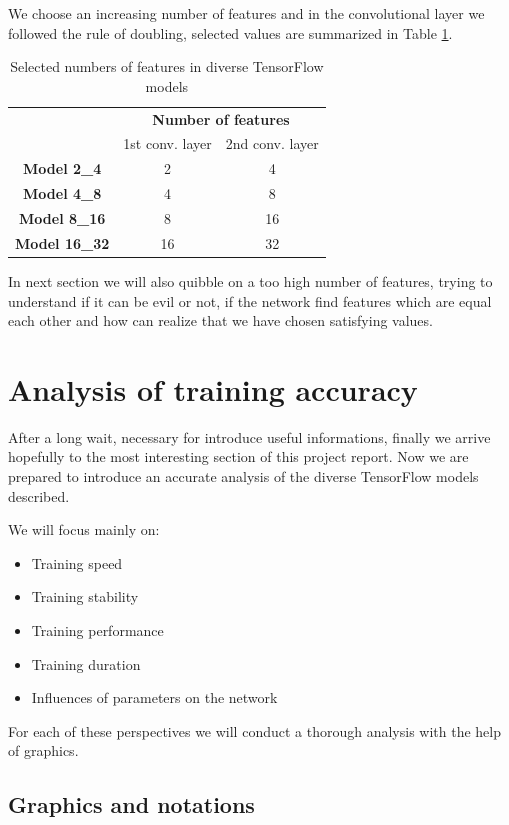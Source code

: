 We choose an increasing number of features and in the convolutional layer we followed the rule of doubling, selected values are summarized in Table \ref{tab:features_number}.

\begin{table}
	\caption{Selected numbers of features in diverse TensorFlow models}
	\label{tab:features_number}
	\centering
	\begin{tabular}{ccc}
		\hline 
		& \multicolumn{2}{c}{\textbf{Number of features}} \\ 
		& 1st conv. layer & 2nd conv. layer \\ 
		\hline 
		\textbf{Model 2\_4} & 2 & 4 \\ 
		\textbf{Model 4\_8} & 4 & 8 \\ 
		\textbf{Model 8\_16} & 8 & 16 \\ 
		\textbf{Model 16\_32} & 16 & 32 \\ 
		\hline 
	\end{tabular}
\end{table}

In next section we will also quibble on a too high number of features, trying to understand if it can be evil or not, if the network find features which are equal each other and how can realize that we have chosen satisfying values.

\section{Analysis of training accuracy}

After a long wait, necessary for introduce useful informations, finally we arrive hopefully to the most interesting section of this project report. Now we are prepared to introduce an accurate analysis of the diverse TensorFlow models described.

We will focus mainly on:
\begin{itemize}
	\item Training speed
	\item Training stability
	\item Training performance
	\item Training duration
	\item Influences of parameters on the network
\end{itemize}

For each of these perspectives we will conduct a thorough analysis with the help of graphics.

\subsection{Graphics and notations}

